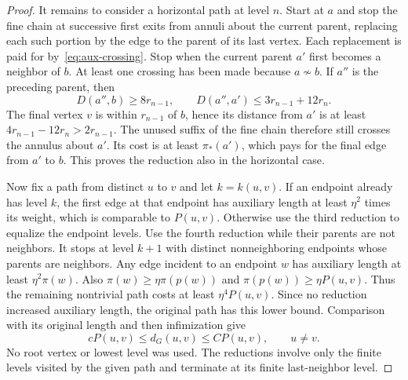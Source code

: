 \documentclass[11pt,reqno]{amsart}
\theoremstyle{plain}
\theoremstyle{definition}
\theoremstyle{remark}
\newcommand{\1}{\mathbf{1}}
\begin{document}
\begin{proof}
It remains to consider a horizontal path at level $n$. Start at $a$ and stop the fine chain at successive first exits from annuli about the current parent, replacing each such portion by the edge to the parent of its last vertex. Each replacement is paid for by~\eqref{eq:aux-crossing}. Stop when the current parent $a'$ first becomes a neighbor of $b$. At least one crossing has been made because $a\not\sim b$. If $a''$ is the preceding parent, then
\begin{equation*}
D(a'',b)\ge8r_{n-1},\qquad
D(a'',a')\le3r_{n-1}+12r_n.
\end{equation*}
The final vertex $v$ is within $r_{n-1}$ of $b$, hence its distance from $a'$ is at least $4r_{n-1}-12r_n>2r_{n-1}$. The unused suffix of the fine chain therefore still crosses the annulus about $a'$. Its cost is at least $\pi_*(a')$, which pays for the final edge from $a'$ to $b$. This proves the reduction also in the horizontal case.

Now fix a path from distinct $u$ to $v$ and let $k=k(u,v)$. If an endpoint already has level $k$, the first edge at that endpoint has auxiliary length at least $\eta^2$ times its weight, which is comparable to $P(u,v)$. Otherwise use the third reduction to equalize the endpoint levels. Use the fourth reduction while their parents are not neighbors. It stops at level $k+1$ with distinct nonneighboring endpoints whose parents are neighbors. Any edge incident to an endpoint $w$ has auxiliary length at least $\eta^2\pi(w)$. Also $\pi(w)\ge\eta\pi(p(w))$ and $\pi(p(w))\ge\eta P(u,v)$. Thus the remaining nontrivial path costs at least $\eta^4P(u,v)$. Since no reduction increased auxiliary length, the original path has this lower bound. Comparison with its original length and then infimization give
\begin{equation}\label{eq:graph-comparison}
cP(u,v)\le d_G(u,v)\le CP(u,v),\qquad u\ne v.
\end{equation}
No root vertex or lowest level was used. The reductions involve only the finite levels visited by the given path and terminate at its finite last-neighbor level.


\end{proof}
\end{document}
